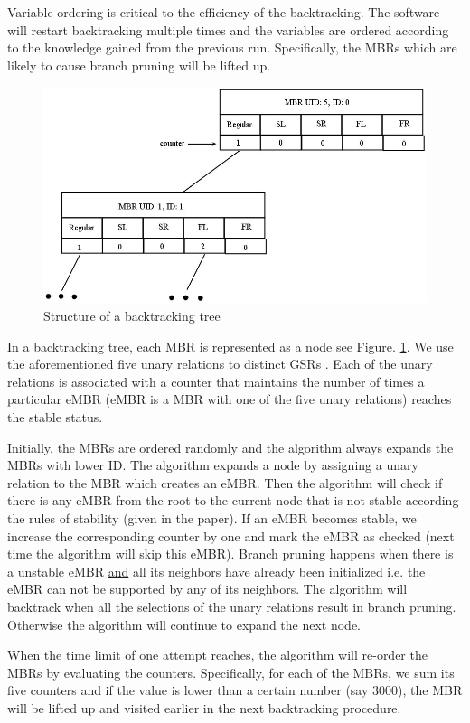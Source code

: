 \documentclass{article}
\begin{document}
Variable ordering is critical to the efficiency of the backtracking. The software will restart backtracking multiple times and the variables are ordered according to the knowledge gained from the previous run. Specifically, the MBRs which are likely to cause branch pruning will be lifted up. 

\begin{figure}[h!]
\centering\includegraphics[scale=0.35]{f1.jpg}\caption{Structure of a backtracking tree}
\label{node}
\end{figure}
In a backtracking tree, each MBR is represented as a node see Figure. \ref{node}. We use the aforementioned five unary relations to distinct GSRs . Each of the unary relations is associated with a counter that maintains the number of times a particular eMBR (eMBR is a MBR with one of the five unary relations) reaches the stable status. 

Initially, the MBRs are ordered randomly and the algorithm always expands the MBRs with lower ID. The algorithm expands a node by assigning a unary relation to the MBR which creates an eMBR. Then the algorithm will check if there is any eMBR from the root to the current node that is not stable according the rules of stability (given in the paper). If an eMBR becomes stable, we increase the corresponding counter by one and mark the eMBR as checked (next time the algorithm will skip this eMBR).  Branch pruning happens when there is a unstable eMBR \underline{and} all its neighbors have already been initialized i.e. the eMBR can not be supported by any of its neighbors. The algorithm will backtrack when all the selections of the unary relations result in branch pruning. 
Otherwise the algorithm will continue to expand the next node.


When the time limit of one attempt reaches, the algorithm will re-order the MBRs by evaluating the counters. Specifically, for each of the MBRs, we sum its five counters and if the value is lower than a certain number (say 3000), the MBR will be lifted up and visited earlier in the next backtracking procedure.  
\end{document}
